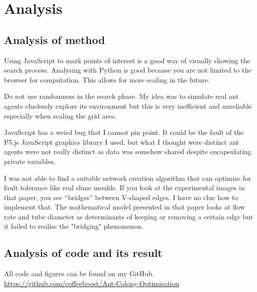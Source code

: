 \documentclass[12pt,a4paper]{article}
\begin{document}
\section{Analysis}
\subsection{Analysis of method}
Using JavaScript to mark points of interest is a good way of visually showing the search process. Analysing with Python is good because you are not limited to the browser for computation. This allows for more scaling in the future.

Do not use randomness in the search phase. My idea was to simulate real ant agents cluelessly explore its environment but this is very inefficient and unreliable especially when scaling the grid area.

JavaScript has a weird bug that I cannot pin point. It could be the fault of the P5.js JavaScript graphics library I used, but what I thought were distinct ant agents were not really distinct as data was somehow shared despite encapsulating private variables.

I was not able to find a suitable network creation algorithm that can optimise for fault tolerance like real slime moulds. If you look at the experimental images in that paper, you see ``bridges'' between V-shaped edges. I have no clue how to implement that. The mathematical model presented in that paper looks at flow rate and tube diameter as determinants of keeping or removing a certain edge but it failed to realise the "bridging" phenomenon.
 
\subsection{Analysis of code and its result}
All code and figures can be found on my GitHub. \url{https://github.com/coffeeboost/Ant-Colony-Optimisation}
\end{document}
